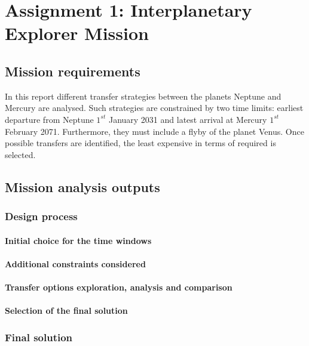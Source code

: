 \documentclass[11pt,a4paper]{report}
\begin{document}
\part{Assignment 1: Interplanetary Explorer Mission}

\chapter{Mission requirements}
In this report different transfer strategies between the planets Neptune and Mercury are analysed.
Such strategies are constrained by two time limits: earliest departure from Neptune $1^{st}$ January 2031 and latest arrival at Mercury $1^{st}$ February 2071. Furthermore, they must include a flyby of the planet Venus.
Once possible transfers are identified, the least expensive in terms of  required is selected.

\chapter{Mission analysis outputs}

\section{Design process}

\subsection{Initial choice for the time windows}

\subsection{Additional constraints considered}

\subsection{Transfer options exploration, analysis and comparison}

\subsection{Selection of the final solution}

\section{Final solution}
\end{document}
